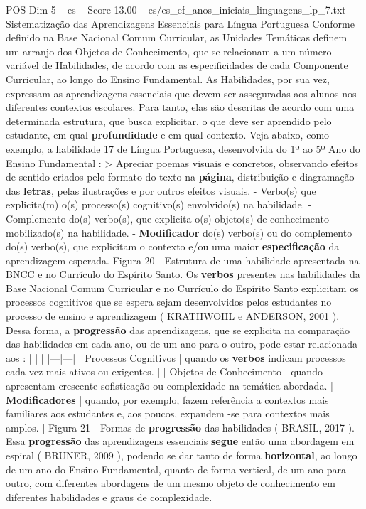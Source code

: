 \begin{textsample}{POS Dim 5 – es – Score 13.00 – es/es\_ef\_anos\_iniciais\_linguagens\_lp\_7.txt}  \label{ex:f5_pos_101}
Sistematização das Aprendizagens Essenciais para Língua Portuguesa Conforme definido na Base Nacional Comum Curricular, as Unidades Temáticas definem um arranjo dos Objetos de Conhecimento, que se relacionam a um número variável de Habilidades, de acordo com as especificidades de cada Componente Curricular, ao longo do Ensino Fundamental.
As Habilidades, por sua vez, expressam as aprendizagens essenciais que devem ser asseguradas aos alunos nos diferentes contextos escolares.
Para tanto, elas são descritas de acordo com uma determinada estrutura, que busca explicitar, o que deve ser aprendido pelo estudante, em qual \textbf{profundidade} e em qual contexto.
Veja abaixo, como exemplo, a habilidade 17 de Língua Portuguesa, desenvolvida do 1º ao 5º Ano do Ensino Fundamental : > Apreciar poemas visuais e concretos, observando efeitos de sentido criados pelo formato do texto na \textbf{página}, distribuição e diagramação das \textbf{letras}, pelas ilustrações e por outros efeitos visuais. - Verbo(s) que explicita(m) o(s) processo(s) cognitivo(s) envolvido(s) na habilidade. - Complemento do(s) verbo(s), que explicita o(s) objeto(s) de conhecimento mobilizado(s) na habilidade. - \textbf{Modificador} do(s) verbo(s) ou do complemento do(s) verbo(s), que explicitam o contexto e/ou uma maior \textbf{especificação} da aprendizagem esperada.
Figura 20 - Estrutura de uma habilidade apresentada na BNCC e no Currículo do Espírito Santo.
Os \textbf{verbos} presentes nas habilidades da Base Nacional Comum Curricular e no Currículo do Espírito Santo explicitam os processos cognitivos que se espera sejam desenvolvidos pelos estudantes no processo de ensino e aprendizagem ( KRATHWOHL e ANDERSON, 2001 ).
Dessa forma, a \textbf{progressão} das aprendizagens, que se explicita na comparação das habilidades em cada ano, ou de um ano para o outro, pode estar relacionada aos : | | | |---|---| | Processos Cognitivos | quando os \textbf{verbos} indicam processos cada vez mais ativos ou exigentes. | | Objetos de Conhecimento | quando apresentam crescente sofisticação ou complexidade na temática abordada. | | \textbf{Modificadores} | quando, por exemplo, fazem referência a contextos mais familiares aos estudantes e, aos poucos, expandem -se para contextos mais amplos. | Figura 21 - Formas de \textbf{progressão} das habilidades ( BRASIL, 2017 ).
Essa \textbf{progressão} das aprendizagens essenciais \textbf{segue} então uma abordagem em espiral ( BRUNER, 2009 ), podendo se dar tanto de forma \textbf{horizontal}, ao longo de um ano do Ensino Fundamental, quanto de forma vertical, de um ano para outro, com diferentes abordagens de um mesmo objeto de conhecimento em diferentes habilidades e graus de complexidade.

\end{textsample}
